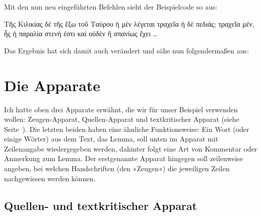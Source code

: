 \begin{lfgwcode}{}
\setcounter{alteSeite}{269}
\newcommand\alteSeite{{|\ledsidenote{\emph{T}~\thealteSeite\stepcounter{alteSeite}}}}
\end{lfgwcode}

Mit den nun neu eingeführten Befehlen sieht der Beispielcode so aus:

\begin{lfgwcode}{}
\beginnumbering
{}
Τῆς Κιλικίας δὲ τῆς ἔξω τοῦ Ταύρου ἡ μὲν λέγεται τραχεῖα ἡ δὲ πεδιάς;
τραχεῖα μέν, ἧς ἡ παραλία \alteSeite{} στενή ἐστι καὶ οὐδὲν ἢ σπανίως ἔχει \dots{}
\pend
\endnumbering
\end{lfgwcode}

Das Ergebnis hat sich damit auch verändert und sähe nun folgendermaßen aus:

\begin{reledmacbsp}{\bsplineenum}
\end{reledmacbsp}

\label{apparate-grundlagen-ende}


\section{Die Apparate}

Ich hatte oben drei Apparate erwähnt, die wir für unser Beispiel verwenden wollen: 
Zeugen-Apparat, Quellen-Apparat und textkritischer Apparat (siehe Seite~\pageref{pil:apparat}). 
Die letzten beiden haben eine ähnliche Funktionsweise: 
Ein Wort (oder einige Wörter) aus dem Text, das Lemma, soll unten im Apparat mit Zeilenangabe wiedergegeben werden, dahinter folgt eine Art von Kommentar oder Anmerkung 
zum Lemma. Der erstgenannte Apparat hingegen soll zeilenweise angeben, 
bei welchen Handschriften (den »Zeugen«) die jeweiligen Zeilen nachgewiesen werden können.


\subsection{Quellen- und textkritischer Apparat}

